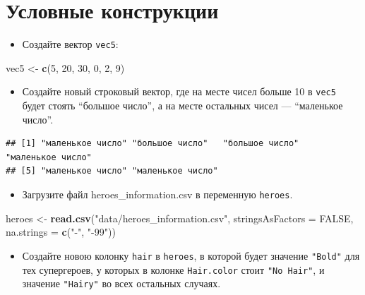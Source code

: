 \documentclass[]{book}
\newenvironment{Shaded}{\begin{snugshade}}{\end{snugshade}}
\newcommand{\KeywordTok}[1]{\textcolor[rgb]{0.13,0.29,0.53}{\textbf{#1}}}
\newcommand{\DataTypeTok}[1]{\textcolor[rgb]{0.13,0.29,0.53}{#1}}
\newcommand{\DecValTok}[1]{\textcolor[rgb]{0.00,0.00,0.81}{#1}}
\newcommand{\StringTok}[1]{\textcolor[rgb]{0.31,0.60,0.02}{#1}}
\newcommand{\OtherTok}[1]{\textcolor[rgb]{0.56,0.35,0.01}{#1}}
\newcommand{\NormalTok}[1]{#1}
\providecommand{\tightlist}{%
  \setlength{\itemsep}{0pt}\setlength{\parskip}{0pt}}
\begin{document}
\section{Условные конструкции}\label{task_if}

\begin{itemize}
\tightlist
\item
  Создайте вектор \texttt{vec5}:
\end{itemize}

\begin{Shaded}
\begin{Highlighting}[]
\NormalTok{vec5 <-}\StringTok{ }\KeywordTok{c}\NormalTok{(}\DecValTok{5}\NormalTok{, }\DecValTok{20}\NormalTok{, }\DecValTok{30}\NormalTok{, }\DecValTok{0}\NormalTok{, }\DecValTok{2}\NormalTok{, }\DecValTok{9}\NormalTok{)}
\end{Highlighting}
\end{Shaded}

\begin{itemize}
\tightlist
\item
  Создайте новый строковый вектор, где на месте чисел больше 10 в
  \texttt{vec5} будет стоять ``большое число'', а на месте остальных
  чисел --- ``маленькое число''.
\end{itemize}

\begin{verbatim}
## [1] "маленькое число" "большое число"   "большое число"   "маленькое число"
## [5] "маленькое число" "маленькое число"
\end{verbatim}

\begin{itemize}
\tightlist
\item
  Загрузите файл heroes\_information.csv в переменную \texttt{heroes}.
\end{itemize}

\begin{Shaded}
\begin{Highlighting}[]
\NormalTok{heroes <-}\StringTok{ }\KeywordTok{read.csv}\NormalTok{(}\StringTok{"data/heroes_information.csv"}\NormalTok{, }
                   \DataTypeTok{stringsAsFactors =} \OtherTok{FALSE}\NormalTok{,}
                   \DataTypeTok{na.strings =} \KeywordTok{c}\NormalTok{(}\StringTok{"-"}\NormalTok{, }\StringTok{"-99"}\NormalTok{))}
\end{Highlighting}
\end{Shaded}

\begin{itemize}
\tightlist
\item
  Создайте новою колонку \texttt{hair} в \texttt{heroes}, в которой
  будет значение \texttt{"Bold"} для тех супергероев, у которых в
  колонке \texttt{Hair.color} стоит \texttt{"No\ Hair"}, и значение
  \texttt{"Hairy"} во всех остальных случаях.
\end{itemize}
\end{document}
